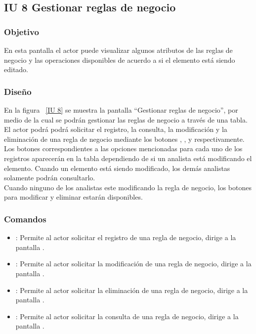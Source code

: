 \subsection{IU 8 Gestionar reglas de negocio}
\subsubsection{Objetivo}
	
	En esta pantalla el actor puede visualizar algunos atributos de las reglas de negocio y las operaciones disponibles de acuerdo a si el elemento está siendo editado.

\subsubsection{Diseño}

    En la figura ~\ref{IU 8} se muestra la pantalla ``Gestionar reglas de negocio'', por medio de la cual 
    se podrán gestionar las reglas de negocio a través de una tabla.
    El actor podrá podrá solicitar el registro, la consulta, la modificación y la eliminación de una regla de negocio mediante los botones
    , \btnConsulta, \btnEditar y \btnEliminar respectivamente. \\
    
    Los botones correspondientes a las opciones mencionadas para cada uno de los registros aparecerán en la tabla dependiendo de si 
    un analista está modificando el elemento. Cuando un elemento está siendo modificado, los demás analistas solamente podrán consultarlo.\\
   
    Cuando ninguno de los analistas este modificando la regla de negocio, los botones para modificar y eliminar estarán disponibles.
    


\subsubsection{Comandos}
\begin{itemize}
	\item {}: Permite al actor solicitar el registro de una regla de negocio, dirige a la pantalla .
	\item \btnEditar[Modificar]: Permite al actor solicitar la modificación de una regla de negocio, dirige a la pantalla .
	\item \btnEliminar[Eliminar]: Permite al actor solicitar la eliminación de una regla de negocio, dirige a la pantalla .
	\item \btnConsulta[Consultar]: Permite al actor solicitar la consulta de una regla de negocio, dirige a la pantalla .
\end{itemize}

